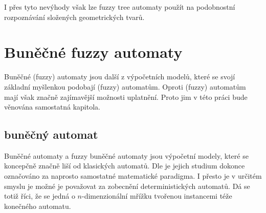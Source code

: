 \documentclass[a4paper,10pt]{article}
\begin{document}
I přes tyto nevýhody však lze fuzzy tree automaty použít na podobnostní rozpoznávání složených geometrických tvarů.

% 

\section{Buněčné fuzzy automaty}

Buněčné (fuzzy) automaty jsou další z výpočetních modelů, které se svojí základní myšlenkou podobají (fuzzy) automatům. Oproti  (fuzzy) automatům mají však značně zajímavější možnosti uplatnění. Proto jim v této práci bude věnována samostatná kapitola.

\subsection{ buněčný automat}
Buněčné automaty a fuzzy buněčné automaty jsou výpočetní modely, které se koncepčně značně liší od klasických automatů. Dle \cite{Wol-NewKinSci} je jejich studium dokonce označováno za naprosto samostatné matematické paradigma. I přesto je v určitém smyslu je možné je považovat za zobecnění  deterministických automatů. Dá se totiž říci, že se jedná o $n$-dimenzionální mřížku tvořenou instancemi téže konečného automatu.
\end{document}
